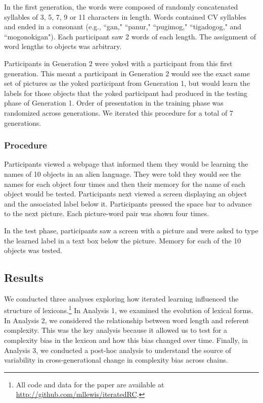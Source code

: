 In the first generation, the words were composed of randomly concatenated syllables of 3, 5, 7, 9 or 11 characters in length. Words contained CV syllables and ended in a consonant (e.g., ``gan," ``panur," ``pugimog," ``tigadogog," and ``mogonokigan"). Each participant saw 2 words of each length. The assignment of word lengths to objects was arbitrary.

Participants in Generation 2 were yoked with a participant from this first generation. This meant a participant in Generation 2 would see the exact same set of pictures as the yoked participant from Generation 1, but would learn the labels for those objects that the yoked participant had produced in the testing phase of Generation 1. Order of presentation in the training phase was randomized across generations. We iterated this procedure for a total of 7 generations.

\subsubsection{Procedure} 


Participants viewed a webpage that informed them they would be learning the names of 10 objects in an alien language. They were told they would see the names for each object four times and then their memory for the name of each object would be tested. Participants next viewed a screen displaying an object and the associated label below it. Participants pressed the space bar to advance to the next picture. Each picture-word pair was shown four times. 

In the test phase, participants saw a screen with a picture and were asked to type the learned label in a text box below the picture. Memory for each of the 10 objects was tested.

\subsection{Results}



We conducted three analyses exploring how iterated learning influenced the structure of lexicons.\footnote{All code and data for the paper are available at \url{http://github.com/mllewis/iteratedRC}.} In Analysis 1, we examined the evolution of lexical forms. In Analysis  2, we considered the relationship between word length and referent complexity. This was the key analysis because it allowed us to test for a complexity bias in the lexicon and how this bias changed over time. Finally, in Analysis  3, we conducted a post-hoc analysis to understand the source of variability in cross-generational change in complexity bias across chains.


